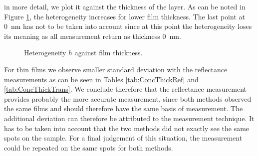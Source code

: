 in more detail, we plot it against the thickness of the layer. As can be noted in Figure \ref{fig:thickheter}, the heterogeneity
increases for lower film thickness. The last point at \SI{0}{\nano\meter} has not to be taken into account since at this point the heterogeneity loses its meaning as all measurement 
return as thickness \SI{0}{\nano\meter}.

\begin{figure}[h]
    \centering
    
    \caption{Heterogeneity $h$ against film thickness.}
    \label{fig:thickheter}
\end{figure}

For thin films we observe smaller standard deviation with the reflectance measurements as can be seen in Tables \ref{tab:ConcThickRef} and \ref{tab:ConcThickTrans}. We conclude therefore that the reflectance 
measurement provides probably the more accurate measurement, since both methods observed the same films and should therefore have the same basis of measurement. The additional deviation can therefore be 
attributed to the measurement technique. It has to be taken into account that the two methods did not exactly see the same spots on the sample. For a final judgement of this situation, the measurement could be 
repeated on the same spots for both methods.


%         
    

%            



%         


